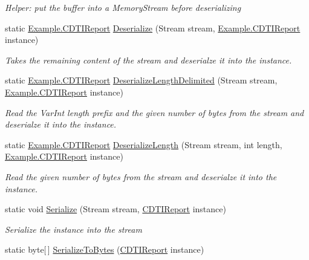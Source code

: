 \begin{DoxyCompactItemize}
\begin{DoxyCompactList}\small\item\em Helper\+: put the buffer into a Memory\+Stream before deserializing\end{DoxyCompactList}\item 
static \hyperlink{class_example_1_1_c_d_t_i_report}{Example.\+C\+D\+T\+I\+Report} \hyperlink{class_example_1_1_c_d_t_i_report_a3259ef658ecda5587d8f394849544307}{Deserialize} (Stream stream, \hyperlink{class_example_1_1_c_d_t_i_report}{Example.\+C\+D\+T\+I\+Report} instance)
\begin{DoxyCompactList}\small\item\em Takes the remaining content of the stream and deserialze it into the instance.\end{DoxyCompactList}\item 
static \hyperlink{class_example_1_1_c_d_t_i_report}{Example.\+C\+D\+T\+I\+Report} \hyperlink{class_example_1_1_c_d_t_i_report_a837fd35c86c5ecd43a9ec5b149a37c2b}{Deserialize\+Length\+Delimited} (Stream stream, \hyperlink{class_example_1_1_c_d_t_i_report}{Example.\+C\+D\+T\+I\+Report} instance)
\begin{DoxyCompactList}\small\item\em Read the Var\+Int length prefix and the given number of bytes from the stream and deserialze it into the instance.\end{DoxyCompactList}\item 
static \hyperlink{class_example_1_1_c_d_t_i_report}{Example.\+C\+D\+T\+I\+Report} \hyperlink{class_example_1_1_c_d_t_i_report_a6842f35b509032e593cac6721c53dc3f}{Deserialize\+Length} (Stream stream, int length, \hyperlink{class_example_1_1_c_d_t_i_report}{Example.\+C\+D\+T\+I\+Report} instance)
\begin{DoxyCompactList}\small\item\em Read the given number of bytes from the stream and deserialze it into the instance.\end{DoxyCompactList}\item 
static void \hyperlink{class_example_1_1_c_d_t_i_report_aa35a297b34ae5b717ad4a35b3d43dfaf}{Serialize} (Stream stream, \hyperlink{class_example_1_1_c_d_t_i_report}{C\+D\+T\+I\+Report} instance)
\begin{DoxyCompactList}\small\item\em Serialize the instance into the stream\end{DoxyCompactList}\item 
static byte\mbox{[}$\,$\mbox{]} \hyperlink{class_example_1_1_c_d_t_i_report_a45ad424e439e8f5cea9306fdf40886ba}{Serialize\+To\+Bytes} (\hyperlink{class_example_1_1_c_d_t_i_report}{C\+D\+T\+I\+Report} instance)

\end{DoxyCompactItemize}
